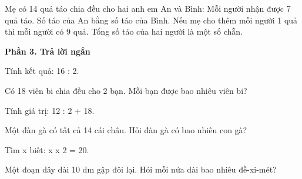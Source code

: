 \begin{ex} %
Mẹ có 14 quả táo chia đều cho hai anh em An và Bình:
\choiceTF
{\True Mỗi người nhận được 7 quả táo.}
{\True Số táo của An bằng số táo của Bình.}
{Nếu mẹ cho thêm mỗi người 1 quả thì mỗi người có 9 quả.}
{\True Tổng số táo của hai người là một số chẵn.}
\end{ex}

\textbf{Phần 3. Trả lời ngắn}

\begin{ex} %
Tính kết quả: 16 : 2.
\end{ex}

\begin{ex} %
Có 18 viên bi chia đều cho 2 bạn. Mỗi bạn được bao nhiêu viên bi?
\end{ex}

\begin{ex} %
Tính giá trị: 12 : 2 + 18.
\end{ex}

\begin{ex} %
Một đàn gà có tất cả 14 cái chân. Hỏi đàn gà có bao nhiêu con gà?
\end{ex}

\begin{ex} %
Tìm x biết: x x 2 = 20.
\end{ex}

\begin{ex} %
Một đoạn dây dài 10 dm gập đôi lại. Hỏi mỗi nửa dài bao nhiêu đề-xi-mét?
\end{ex}

